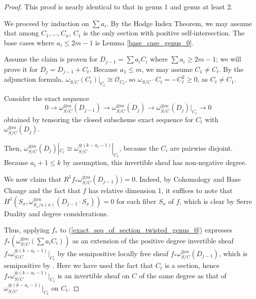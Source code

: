 \begin{proof}
This proof is nearly identical to that in genus 1 and genus at least 2.

We proceed by induction on $\sum a_i$.
By the Hodge Index Theorem, we may assume that among $C_1,\ldots,C_n$, $C_1$ is the only section with positive self-intersection.
The base cases where $a_i\le 2m-1$ is Lemma \ref{base_case_genus_0}.

Assume the claim is proven for $D_{j-1}=\sum a_iC_i$ where $\sum a_i\ge 2m-1$; we will prove it for $D_{j}=D_{j-1}+C_t$.
Because $a_{1}\le m$, we may assume $C_1\neq C_t$.
By the adjunction formula, $\omega_{S/C}(C_t)|_{C_t}\cong\mathcal{O}_{C_t}$, so $\omega_{S/C}\cdot C_t=-C_t^2\ge0$, as $C_t\neq C_1$.

Consider the exact sequence
\begin{equation*}\label{exact_seq_of_section_twisted_genus_0}
0\to\omega_{S/C}^{\otimes m}(D_{j-1})\to\omega_{S/C}^{\otimes m}(D_j)\to \omega_{S/C}^{\otimes m}(D_j)|_{C_t}\to0
\end{equation*}
obtained by tensoring the closed subscheme exact sequence for $C_t$ with $\omega_{S/C}^{\otimes m}(D_j)$.

Then, $\omega_{S/C}^{\otimes m}(D_j)|_{C_t}\cong \omega_{S/C}^{\otimes (k-a_{t}-1)}|_{C_t}$, because the $C_i$ are pairwise disjoint.
Because $a_{t}+1\le k$ by assumption, this invertible sheaf has non-negative degree.

We now claim that $R^{1}f_{*}\omega_{S/C}^{\otimes m}(D_{j-1}))=0$.
Indeed, by Cohomology and Base Change and the fact that $f$ has relative dimension 1, it suffices to note that $H^{1}(S_x,\omega_{S_x/\kappa(x)}^{\otimes m}(D_{j-1}\cdot S_x))=0$ for each fiber $S_x$ of $f$, which is clear by Serre Duality and degree considerations.

Thus, applying $f_{*}$ to (\ref{exact_seq_of_section_twisted_genus_0}) expresses $f_{*}(\omega_{S/C}^{\otimes m}(\sum a_iC_i))$ as an extension of the positive degree invertible sheaf $f_{*}\omega_{S/C}^{\otimes (k-a_{t}-1)}|_{C_t}$ by the semipositive locally free sheaf $f_{*}\omega_{S/C}^{\otimes m}(D_{j-1})$, which is semipositive by .
Here we have used the fact that $C_t$ is a section, hence $f_{*}\omega_{S/C}^{\otimes (k-a_{t}-1)}|_{C_t}$ is an invertible sheaf on $C$ of the same degree as that of $\omega_{S/C}^{\otimes (k-a_{t}-1)}|_{C_t}$ on $C_t$.
\end{proof}

